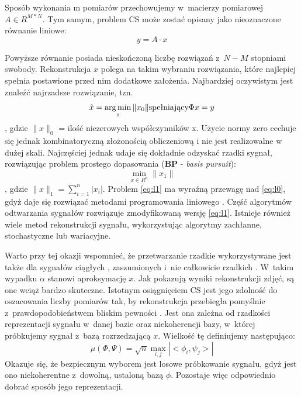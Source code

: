 Sposób wykonania m pomiarów przechowujemy w~macierzy pomiarowej $A \in R^{M*N}$. Tym samym, problem CS może zostać opisany jako nieoznaczone równanie liniowe: 
\begin{equation}
	y = A \cdot x
	\label{eq:lin}
\end{equation}

Powyższe równanie posiada nieskończoną liczbę rozwiązań z~$N - M$ stopniami swobody. Rekonstrukcja $x$ polega na takim wybraniu rozwiązania, które najlepiej spełnia postawione przed nim dodatkowe założenia. Najbardziej oczywistym jest znaleźć najrzadsze rozwiązanie, tzn.
\begin{equation}
	\hat{x} = \operatorname*{arg\,min}_z \|x_0\| \text{spełniający} \Phi x=y
	\label{eq:l0}
\end{equation} \cite{CandesIntro, Davenport2010, Zhang2013}, gdzie $\|x\|_0$ = ilość niezerowych współczynników x. Użycie normy zero cechuje się jednak kombinatoryczną złożonością obliczeniową i nie jest realizowalne w dużej skali. Najczęściej jednak udaje się dokładnie odzyskać rzadki sygnał, rozwiązując problem prostego dopasowania (\textbf{BP} - \textit{basis pursuit}):
\begin{equation}
\min_{x \in R^n} \|x_1\| 
\label{eq:l1}
\end{equation}, gdzie $\|x\|_1 = \sum_{i=1}^{n} |x_i|$. Problem \ref{eq:l1} ma wyraźną przewagę nad \ref{eq:l0}, gdyż daje się rozwiązać metodami programowania liniowego \cite{Fountoulakis2012}. Część algorytmów odtwarzania sygnałów rozwiązuje zmodyfikowaną wersję \ref{eq:l1}. Istnieje również wiele metod rekonstrukcji sygnału, wykorzystując algorytmy zachłanne, stochastyczne lub wariacyjne.
 
Warto przy tej okazji wspomnieć, że przetwarzanie rzadkie wykorzystywane jest także dla sygnałów ciągłych \cite{Eldar2009}, zaszumionych i~nie całkowicie rzadkich \cite{Cevher2009}. W~takim wypadku $\alpha$ stanowi aproksymację $x$. Jak pokazują wyniki rekonstrukcji zdjęć, są one wciąż bardzo skuteczne. 
\newline{}
Istotnym osiągnięciem CS jest jego zdolność do oszacowania liczby pomiarów tak, by rekonstrukcja przebiegła pomyślnie z~prawdopodobieństwem bliskim pewności \cite{CandesIntro}. Jest ona zależna od rzadkości reprezentacji sygnału w~danej bazie oraz niekoherencji bazy, w~której próbkujemy sygnał z~bazą rozrzedzającą $x$. Wielkość tę definiujemy następująco:
\begin{equation}
	\mu (\Phi,\Psi) = \sqrt{n} \max_{i, j} |<\phi_i, \psi_j>|
	\label{eq:coherence}
\end{equation}
Okazuje się, że bezpiecznym wyborem jest losowe próbkowanie sygnału, gdyż jest ono niekoherentne z~dowolną, ustaloną bazą $\phi$. Pozostaje więc odpowiednio dobrać sposób jego reprezentacji.

